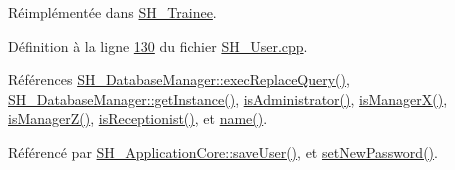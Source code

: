 Réimplémentée dans \hyperlink{classSH__Trainee_ac118976aaa960a727127370e625a3bb9}{S\-H\-\_\-\-Trainee}.



Définition à la ligne \hyperlink{SH__User_8cpp_source_l00130}{130} du fichier \hyperlink{SH__User_8cpp_source}{S\-H\-\_\-\-User.\-cpp}.



Références \hyperlink{classSH__DatabaseManager_a25e0f24d7833c2728f55b85be529063d}{S\-H\-\_\-\-Database\-Manager\-::exec\-Replace\-Query()}, \hyperlink{classSH__DatabaseManager_a31198eb4de0f8b18e3fa0eed09f24d19}{S\-H\-\_\-\-Database\-Manager\-::get\-Instance()}, \hyperlink{classSH__User_a2a9cbd9e27e5047ec108d4f373884de5}{is\-Administrator()}, \hyperlink{classSH__User_af5e5639aa5f7794b5b169f0ed0333268}{is\-Manager\-X()}, \hyperlink{classSH__User_a763479597c54bb92ad2490826dedacfa}{is\-Manager\-Z()}, \hyperlink{classSH__User_a6e78a5559a202eb3f2bd79e50768da7f}{is\-Receptionist()}, et \hyperlink{classSH__User_ae91e70207f4057846667af6e1c300d96}{name()}.



Référencé par \hyperlink{classSH__ApplicationCore_a30bb8d51f737740e33c2063bc30a0213}{S\-H\-\_\-\-Application\-Core\-::save\-User()}, et \hyperlink{classSH__User_ada3160c3abf1b200646cb6f4fe5ccd72}{set\-New\-Password()}.


